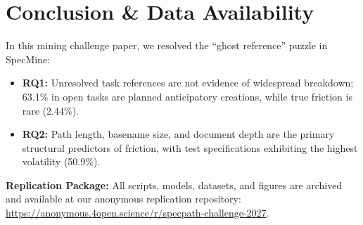 \documentclass[10pt,conference]{IEEEtran}
\begin{document}
\section{Conclusion \& Data Availability}
In this mining challenge paper, we resolved the ``ghost reference'' puzzle in SpecMine:
\begin{itemize}
    \item \textbf{RQ1:} Unresolved task references are not evidence of widespread breakdown; 63.1\% in open tasks are planned anticipatory creations, while true friction is rare (2.44\%).
    \item \textbf{RQ2:} Path length, basename size, and document depth are the primary structural predictors of friction, with test specifications exhibiting the highest volatility (50.9\%).
\end{itemize}

\textbf{Replication Package:} All scripts, models, datasets, and figures are archived and available at our anonymous replication repository: \url{https://anonymous.4open.science/r/specpath-challenge-2027}.

\balance


\end{document}
